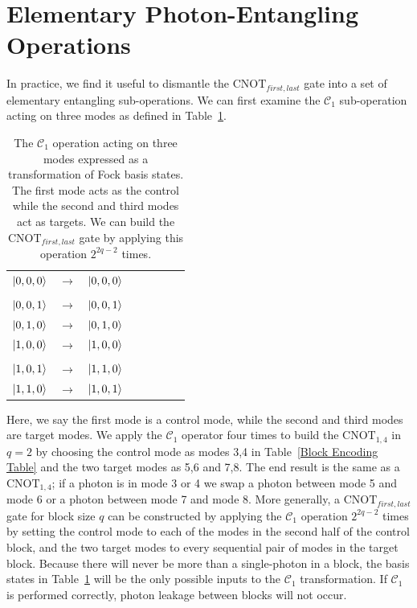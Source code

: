 \documentclass[aps,pra,twocolumn,showpacs,superscriptaddress,floatfix,10pt]{revtex4}
\begin{document}
\section{Elementary Photon-Entangling Operations}
\label{Section Elementary Photon Entangling Operations}

 In practice, we find it useful to dismantle the $\mbox{CNOT}_{first,last}$ gate into a set of elementary entangling sub-operations. We can first examine the $\mathcal{C}_1$ sub-operation acting on three modes as defined in Table~\ref{One Control Two Targets}. 
\begin {table}[h]
\begin{center}
	\begin{tabular}{l*{6}{c}r} 
		$\ket{0,0,0}$  &  $\rightarrow$ & $\ket{0,0,0}$ \\ \\
		$\ket{0,0,1}$  & $\rightarrow$ & $\ket{0,0,1}$ \\
		$\ket{0,1,0}$ & $\rightarrow$ & $\ket{0,1,0}$ \\
		$\ket{1,0,0}$ & $\rightarrow$ & $\ket{1,0,0} $ \\ \\
		$\ket{1,0,1}$ & $\rightarrow$ & $\ket{1,1,0}$ \\
		$\ket{1,1,0}$ & $\rightarrow$ & $\ket{1,0,1}$ \\
	\end{tabular}
	\caption{ \label{One Control Two Targets} The $\mathcal{C}_1$  operation acting on three modes expressed as a transformation of Fock basis states. The first mode acts as the control while the second and third modes act as targets. We can build the $\mbox{CNOT}_{first,last}$ gate by applying this operation $2^{2 q -2}$ times.}
\end{center}
\end{table}
Here, we say the first mode is a control mode, while the second and third modes are target modes. We apply the $\mathcal{C}_1$  operator four times to build the $\mbox{CNOT}_{1,4}$ in $q=2$ by choosing the control mode as modes 3,4 in Table~\ref{Block Encoding Table} and the two target modes as 5,6 and 7,8. The end result is the same as a $\mbox{CNOT}_{1,4}$; if a photon is in mode 3 or 4 we swap a photon between mode 5 and mode 6 or a photon between mode 7 and mode 8. More generally, a $\mbox{CNOT}_{first,last}$ gate for block size $q$ can be constructed by applying the $\mathcal{C}_1$  operation $2^{2q-2}$ times by setting the control mode to each of the modes in the second half of the control block, and the two target modes to every sequential pair of modes in the target block. Because there will never be more than a single-photon in a block, the basis states in Table~\ref{One Control Two Targets} will be the only possible inputs to the $\mathcal{C}_1$  transformation. If $\mathcal{C}_1$ is performed correctly, photon leakage between blocks will not occur.
\end{document}

